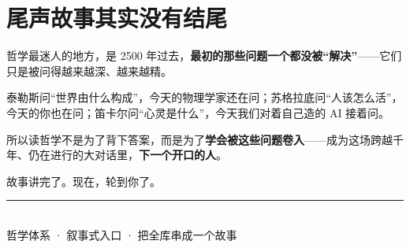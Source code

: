 \documentclass[12pt,a4paper,fontset=none]{ctexart}
\begin{document}
\section*{尾声\quad 故事其实没有结尾}

哲学最迷人的地方，是 2500 年过去，\textbf{最初的那些问题一个都没被“解决”}——它们只是被问得越来越深、越来越精。

泰勒斯问“世界由什么构成”，今天的物理学家还在问；苏格拉底问“人该怎么活”，今天的你也在问；笛卡尔问“心灵是什么”，今天我们对着自己造的 AI 接着问。

所以读哲学不是为了背下答案，而是为了\textbf{学会被这些问题卷入}——成为这场跨越千年、仍在进行的大对话里，\textbf{下一个开口的人}。

\begin{center}
\vspace{0.6em}
{\notomed\color{accent}\Large 故事讲完了。现在，轮到你了。}
\vspace{0.4em}
\end{center}

\vfill
\begin{center}
{\color{rule}\rule{0.35\textwidth}{0.6pt}}\\[0.4em]
{\small\sffamily\color{notebar} 哲学体系 · 叙事式入口 · 把全库串成一个故事}
\end{center}
\end{document}
